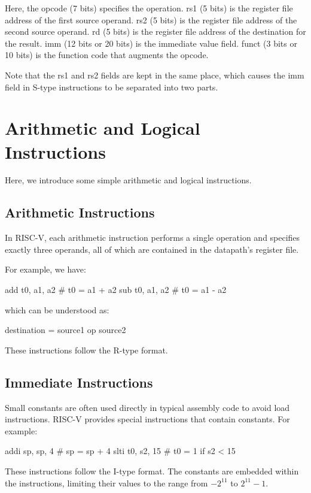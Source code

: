 Here, the opcode (7 bits) specifies the operation. rs1 (5 bits) is the register file address of the first source operand. rs2 (5 bits) is the register file address of the second source operand. rd (5 bits) is the register file address of the destination for the result. imm (12 bits or 20 bits) is the immediate value field. funct (3 bits or 10 bits) is the function code that augments the opcode.

Note that the rs1 and rs2 fields are kept in the same place, which causes the imm field in S-type instructions to be separated into two parts.

\section{Arithmetic and Logical Instructions}
Here, we introduce some simple arithmetic and logical instructions.

\subsection{Arithmetic Instructions}
In RISC-V, each arithmetic instruction performs a single operation and specifies exactly three operands, all of which are contained in the datapath's register file.

For example, we have:
\begin{codeBlock}
  add t0, a1, a2   # t0 = a1 + a2
  sub t0, a1, a2   # t0 = a1 - a2
\end{codeBlock}

which can be understood as:
\begin{codeBlock}
  destination = source1 op source2
\end{codeBlock}

These instructions follow the R-type format.

\subsection{Immediate Instructions}
Small constants are often used directly in typical assembly code to avoid load instructions. RISC-V provides special instructions that contain constants. For example:
\begin{codeBlock}
  addi sp, sp, 4    # sp = sp + 4
  slti t0, s2, 15   # t0 = 1 if s2 < 15
\end{codeBlock}

These instructions follow the I-type format. The constants are embedded within the instructions, limiting their values to the range from \(-2^{11}\) to \(2^{11} - 1\). 

